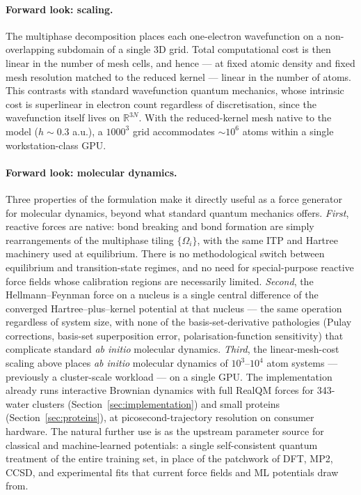 \documentclass[11pt]{article}
\begin{document}
\paragraph{Forward look: scaling.}
The multiphase decomposition places each one-electron wavefunction on a non-overlapping subdomain of a single 3D grid. Total computational cost is then linear in the number of mesh cells, and hence --- at fixed atomic density and fixed mesh resolution matched to the reduced kernel --- linear in the number of atoms. This contrasts with standard wavefunction quantum mechanics, whose intrinsic cost is superlinear in electron count regardless of discretisation, since the wavefunction itself lives on $\mathbb{R}^{3N}$. With the reduced-kernel mesh native to the model ($h \sim 0.3$ a.u.), a $1000^3$ grid accommodates $\sim 10^6$ atoms within a single workstation-class GPU.

\paragraph{Forward look: molecular dynamics.}
Three properties of the formulation make it directly useful as a force generator for molecular dynamics, beyond what standard quantum mechanics offers. \emph{First}, reactive forces are native: bond breaking and bond formation are simply rearrangements of the multiphase tiling $\{\Omega_i\}$, with the same ITP and Hartree machinery used at equilibrium. There is no methodological switch between equilibrium and transition-state regimes, and no need for special-purpose reactive force fields whose calibration regions are necessarily limited. \emph{Second}, the Hellmann--Feynman force on a nucleus is a single central difference of the converged Hartree--plus--kernel potential at that nucleus --- the same operation regardless of system size, with none of the basis-set-derivative pathologies (Pulay corrections, basis-set superposition error, polarisation-function sensitivity) that complicate standard \emph{ab initio} molecular dynamics. \emph{Third}, the linear-mesh-cost scaling above places \emph{ab initio} molecular dynamics of $10^3$--$10^4$ atom systems --- previously a cluster-scale workload --- on a single GPU. The implementation already runs interactive Brownian dynamics with full RealQM forces for 343-water clusters (Section~\ref{sec:implementation}) and small proteins (Section~\ref{sec:proteins}), at picosecond-trajectory resolution on consumer hardware. The natural further use is as the upstream parameter source for classical and machine-learned potentials: a single self-consistent quantum treatment of the entire training set, in place of the patchwork of DFT, MP2, CCSD, and experimental fits that current force fields and ML potentials draw from.
\end{document}
